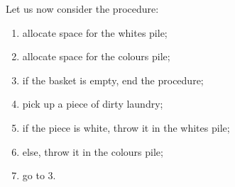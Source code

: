 \begin{codebox}
\end{codebox}

Let us now consider the  procedure: 

\begin{enumerate}

\item allocate space for the whites pile;

\item allocate space for the colours pile;

\item if the basket is empty, end the procedure;

\item pick up a piece of dirty laundry;

\item if the piece is white, throw it in the whites pile;

\item else, throw it in the colours pile;

\item go to 3.

\end{enumerate}
